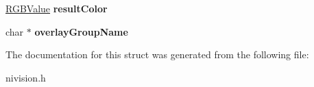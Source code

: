 \begin{DoxyCompactItemize}
\item 
\hypertarget{structClampOverlaySettings__struct_aa2ba9bb2598ef2a55ca6f27b8c218a94}{
\hyperlink{structRGBValue__struct}{RGBValue} {\bfseries resultColor}}
\label{structClampOverlaySettings__struct_aa2ba9bb2598ef2a55ca6f27b8c218a94}

\item 
\hypertarget{structClampOverlaySettings__struct_a872a5001b212064152a13901d2bc344a}{
char $\ast$ {\bfseries overlayGroupName}}
\label{structClampOverlaySettings__struct_a872a5001b212064152a13901d2bc344a}

\end{DoxyCompactItemize}


The documentation for this struct was generated from the following file:\begin{DoxyCompactItemize}
\item 
nivision.h\end{DoxyCompactItemize}
